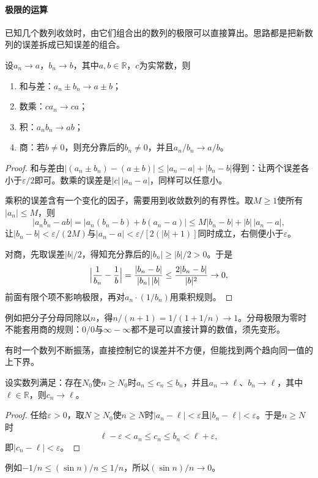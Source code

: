\paragraph{极限的运算}
已知几个数列收敛时，由它们组合出的数列的极限可以直接算出。思路都是把新数列的误差拆成已知误差的组合。
\begin{theorem}[数列极限的四则运算]
\label{thm:ru-sequence-limit-laws}
设$a_n\to a$，$b_n\to b$，其中$a,b\in\mathbb R$，$c$为实常数，则
\begin{enumerate}
 \item 和与差：$a_n\pm b_n\to a\pm b$；
 \item 数乘：$ca_n\to ca$；
 \item 积：$a_nb_n\to ab$；
 \item 商：若$b\neq0$，则充分靠后的$b_n\neq0$，并且$a_n/b_n\to a/b$。
\end{enumerate}
\end{theorem}
\begin{proof}
和与差由$|(a_n\pm b_n)-(a\pm b)|\leq|a_n-a|+|b_n-b|$得到：让两个误差各小于$\varepsilon/2$即可。数乘的误差是$|c|\,|a_n-a|$，同样可以任意小。

乘积的误差含有一个变化的因子，需要用到收敛数列的有界性。取$M\geq1$使所有$|a_n|\leq M$，则
\[
 |a_nb_n-ab|=|a_n(b_n-b)+b(a_n-a)|\leq M|b_n-b|+|b|\,|a_n-a|,
\]
让$|b_n-b|<\varepsilon/(2M)$与$|a_n-a|<\varepsilon/[2(|b|+1)]$同时成立，右侧便小于$\varepsilon$。

对商，先取误差$|b|/2$，得知充分靠后的$|b_n|\geq|b|/2>0$。于是
\[
 \Bigl|\frac1{b_n}-\frac1b\Bigr|=\frac{|b_n-b|}{|b_n|\,|b|}\leq\frac{2|b_n-b|}{|b|^2}\to0,
\]
前面有限个项不影响极限，再对$a_n\cdot(1/b_n)$用乘积规则。
\end{proof}
例如把分子分母同除以$n$，得$n/(n+1)=1/(1+1/n)\to1$。分母极限为零时不能套用商的规则：$0/0$与$\infty-\infty$都不是可以直接计算的数值，须先变形。

有时一个数列不断振荡，直接控制它的误差并不方便，但能找到两个趋向同一值的上下界。
\begin{theorem}[夹逼定理]
\label{thm:analysis-sequence-squeeze}
设实数列满足：存在$N_0$使$n\geq N_0$时$a_n\leq c_n\leq b_n$，并且$a_n\to\ell$、$b_n\to\ell$，其中$\ell\in\mathbb R$，则$c_n\to\ell$。
\end{theorem}
\begin{proof}
任给$\varepsilon>0$，取$N\geq N_0$使$n\geq N$时$|a_n-\ell|<\varepsilon$且$|b_n-\ell|<\varepsilon$。于是$n\geq N$时
\[
 \ell-\varepsilon<a_n\leq c_n\leq b_n<\ell+\varepsilon,
\]
即$|c_n-\ell|<\varepsilon$。
\end{proof}
例如$-1/n\leq(\sin n)/n\leq1/n$，所以$(\sin n)/n\to0$。

